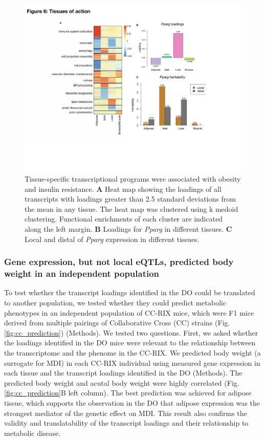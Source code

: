 \documentclass[
]{article}
\begin{document}
\begin{figure}[ht!]
\includegraphics[width=\textwidth]{Figures/Fig6_TOA.pdf} 
\caption{Tissue-specific transcriptional programs were associated 
with obesity and insulin resistance. \textbf{A} Heat map showing 
the loadings of all transcripts with loadings greater than 2.5 
standard deviations from the mean in any tissue. The heat map was 
clustered using k medoid clustering. Functional enrichments of each 
cluster are indicated along the left margin. \textbf{B} Loadings for 
\textit{Pparg} in different tissues. \textbf{C} Local and distal of 
\textit{Pparg} expression in different tissues.
}
\label{fig:toa}
\end{figure}

\subsubsection{Gene expression, but not local eQTLs, predicted body
weight in an independent
population}\label{gene-expression-but-not-local-eqtls-predicted-body-weight-in-an-independent-population}

To test whether the transcript loadings identified in the DO could be
translated to another population, we tested whether they could predict
metabolic phenotypes in an independent population of CC-RIX mice, which
were F1 mice derived from multiple pairings of Collaborative Cross (CC)
\cite{pmid28592495, pmid21411855, 
pmid17674098, pmid15514660} strains (Fig. \ref{fig:cc_prediction})
(Methods). We tested two questions. First, we asked whether the loadings
identified in the DO mice were relevant to the relationship between the
transcriptome and the phenome in the CC-RIX. We predicted body weight (a
surrogate for MDI) in each CC-RIX individual using measured gene
expression in each tissue and the transcript loadings identified in the
DO (Methods). The predicted body weight and acutal body weight were
highly correlated (Fig. \ref{fig:cc_prediction}B left column). The best
prediction was achieved for adipose tissue, which supports the
observation in the DO that adipose expression was the strongest mediator
of the genetic effect on MDI. This result also confirms the validity and
translatability of the transcript loadings and their relationship to
metabolic disease.
\end{document}
